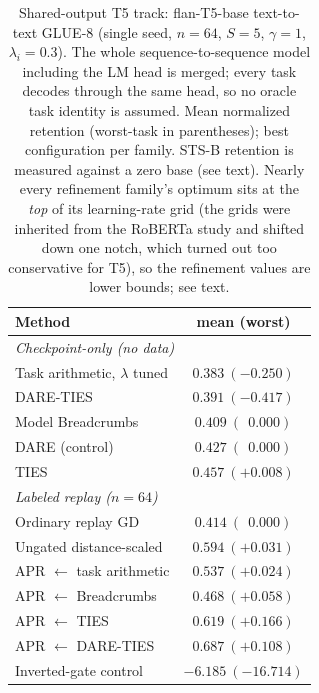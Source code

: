 \documentclass[11pt]{article}
\begin{document}
\begin{table}[t]
\centering
\small
\caption{Shared-output T5 track: flan-T5-base text-to-text GLUE-8 (single seed, $n=64$, $S=5$, $\gamma=1$, $\lambda_i=0.3$). The whole sequence-to-sequence model including the LM head is merged; every task decodes through the same head, so no oracle task identity is assumed. Mean normalized retention (worst-task in parentheses); best configuration per family. STS-B retention is measured against a zero base (see text). Nearly every refinement family's optimum sits at the \emph{top} of its learning-rate grid (the grids were inherited from the RoBERTa study and shifted down one notch, which turned out too conservative for T5), so the refinement values are lower bounds; see text.}
\label{tab:t5}
\begin{tabular}{lc}
\toprule
Method & mean (worst) \\
\midrule
\multicolumn{2}{l}{\emph{Checkpoint-only (no data)}}\\
Task arithmetic, $\lambda$ tuned          & $0.383\ (-0.250)$ \\
DARE-TIES                                 & $0.391\ (-0.417)$ \\
Model Breadcrumbs                         & $0.409\ (\ \ 0.000)$ \\
DARE (control)                            & $0.427\ (\ \ 0.000)$ \\
TIES                                      & $0.457\ (+0.008)$ \\
\midrule
\multicolumn{2}{l}{\emph{Labeled replay ($n=64$)}}\\
Ordinary replay GD                        & $0.414\ (\ \ 0.000)$ \\
Ungated distance-scaled                   & $0.594\ (+0.031)$ \\
APR $\leftarrow$ task arithmetic          & $0.537\ (+0.024)$ \\
APR $\leftarrow$ Breadcrumbs              & $0.468\ (+0.058)$ \\
APR $\leftarrow$ TIES                     & $0.619\ (+0.166)$ \\
APR $\leftarrow$ DARE-TIES                & $\mathbf{0.687}\ (+0.108)$ \\
\midrule
Inverted-gate control                     & $-6.185\ (-16.714)$ \\
\bottomrule
\end{tabular}
\end{table}
\end{document}
